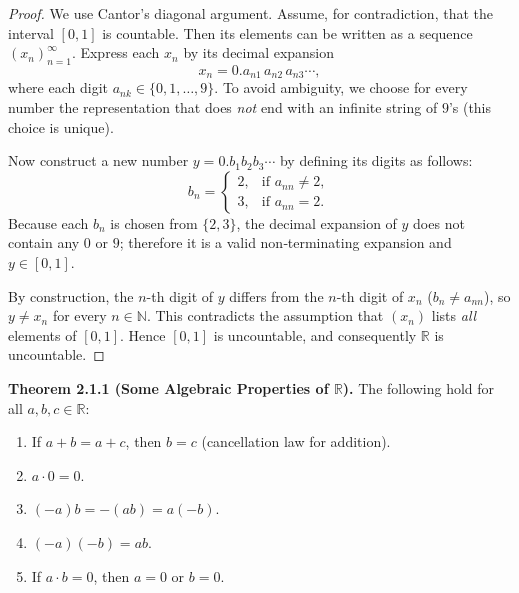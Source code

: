 \documentclass[12pt,a4paper]{article}
\theoremstyle{definition}
\newcommand{\R}{\mathbb{R}}
\newcommand{\N}{\mathbb{N}}
\begin{document}
\begin{proof}
We use Cantor's diagonal argument. Assume, for contradiction, that the interval \([0,1]\) is countable. Then its elements can be written as a sequence \((x_n)_{n=1}^\infty\). Express each \(x_n\) by its decimal expansion
\[
    x_n = 0.a_{n1}\,a_{n2}\,a_{n3}\cdots,
\]
where each digit \(a_{nk}\in\{0,1,\dots,9\}\). To avoid ambiguity, we choose for every number the representation that does \emph{not} end with an infinite string of \(9\)'s (this choice is unique).

Now construct a new number \(y = 0.b_1b_2b_3\cdots\) by defining its digits as follows:
\[
    b_n = \begin{cases}
        2, & \text{if } a_{nn}\neq 2,\\
        3, & \text{if } a_{nn}=2.
    \end{cases}
\]
Because each \(b_n\) is chosen from \(\{2,3\}\), the decimal expansion of \(y\) does not contain any \(0\) or \(9\); therefore it is a valid non‑terminating expansion and \(y\in[0,1]\).

By construction, the \(n\)-th digit of \(y\) differs from the \(n\)-th digit of \(x_n\) (\(b_n\neq a_{nn}\)), so \(y\neq x_n\) for every \(n\in\N\). This contradicts the assumption that \((x_n)\) lists \emph{all} elements of \([0,1]\). Hence \([0,1]\) is uncountable, and consequently \(\R\) is uncountable.
\end{proof}

\textbf{Theorem 2.1.1 (Some Algebraic Properties of \(\R\)).}
The following hold for all \(a,b,c\in\R\):
\begin{enumerate}[label=(\alph*)]
    \item If \(a+b=a+c\), then \(b=c\) \hfill (cancellation law for addition).
    \item \(a\cdot 0 = 0\).
    \item \((-a)b = -(ab) = a(-b)\).
    \item \((-a)(-b)=ab\).
    \item If \(a\cdot b = 0\), then \(a=0\) or \(b=0\).
\end{enumerate}
\end{document}
